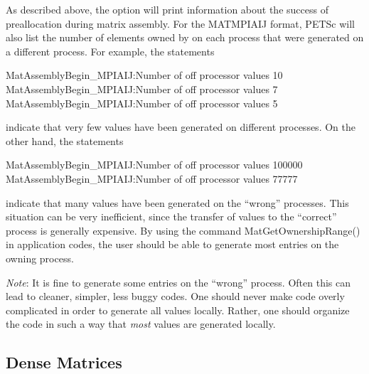 As described above, the option  
will print information about the success of preallocation during
matrix assembly.  For the MATMPIAIJ format, PETSc will also list
the number of elements owned by on each process that were generated
on a different process.  For example, the statements
\begin{tabbing}
   MatAssemblyBegin\_MPIAIJ:Number of off processor values 10\\
   MatAssemblyBegin\_MPIAIJ:Number of off processor values 7\\
   MatAssemblyBegin\_MPIAIJ:Number of off processor values 5
\end{tabbing}
indicate that very few values have been generated on different processes.
On the other hand, the statements
\begin{tabbing}
   MatAssemblyBegin\_MPIAIJ:Number of off processor values 100000\\
   MatAssemblyBegin\_MPIAIJ:Number of off processor values 77777
\end{tabbing}
indicate that many values have been generated on the ``wrong'' processes.
This situation can be very inefficient, since the transfer of values
to the ``correct'' process is generally expensive.  By using the command
MatGetOwnershipRange() in application codes, the user should be able
to generate most entries on the owning process.

{\em Note}: It is fine to generate some entries on the ``wrong'' process. Often
this can lead to cleaner, simpler, less buggy codes.  One should never
make code overly complicated in order to generate all values locally. Rather,
one should organize the code in such a way that {\em most} values are generated locally.

\subsection{Dense Matrices}
\label{sec_matdense}

